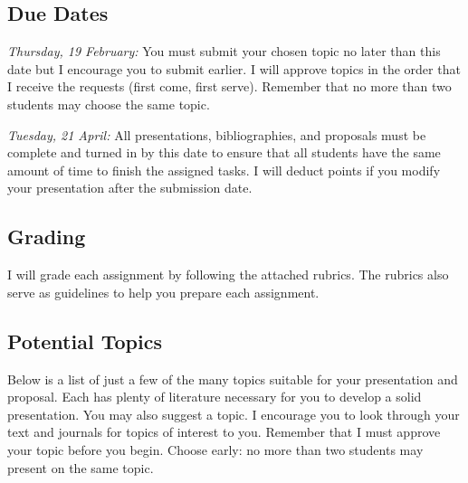 \documentclass[11pt]{article}
\newcommand{\VSpace}{\vspace{\baselineskip}}
\begin{document}
\subsection*{Due Dates}

\textit{Thursday, 19 February:} You must submit your chosen topic no later than this date but I encourage you to submit earlier. I will approve topics in the order that I receive the requests (first come, first serve). Remember that no more than two students may choose the same topic.\VSpace

\noindent\textit{Tuesday, 21 April:}  All presentations, bibliographies, and proposals must be complete and turned in by this date to ensure that all students have the same amount of time to finish the assigned tasks.  I will deduct points if you modify your presentation after the submission date.

\subsection*{Grading}

I will grade each assignment by following the attached rubrics.  The rubrics also serve as guidelines to help you prepare each assignment.

\subsection*{Potential Topics}

Below is a list of just a few of the many topics suitable for your presentation and proposal.  Each has plenty of literature necessary for you to develop a solid presentation.  You may also suggest a topic.  I encourage you to look through your text and journals for topics of interest to you.  Remember that I must approve your topic before you begin.  Choose early: no more than two students may present on the same topic.
\end{document}
